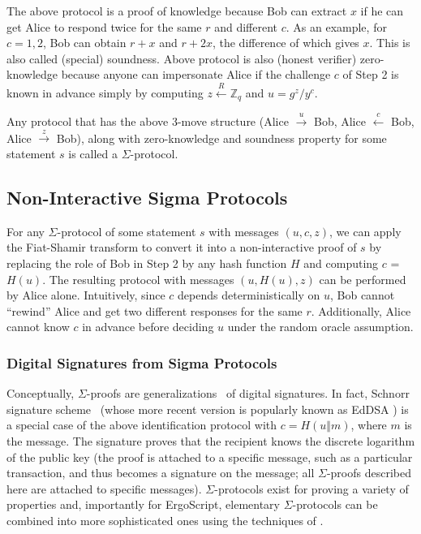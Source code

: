 \documentclass[11pt]{article}
\newcommand{\langname}{ErgoScript\xspace}
\begin{document}
The above protocol is a proof of knowledge because Bob can extract $x$ if he can get Alice to respond twice for the same $r$ and different $c$. As an example, for $c = 1, 2$, Bob can obtain $r+x$ and $r+2x$, the difference of which gives $x$. This is also called (special) soundness. Above protocol is also (honest verifier) zero-knowledge because anyone can impersonate Alice if the challenge $c$ of Step 2 is known in advance simply by computing $z \stackrel{R}{\leftarrow} \mathbb{Z}_q$ and $u = g^z/y^c$. 

Any protocol that has the above 3-move structure (Alice $\stackrel{u}{\rightarrow}$ Bob, Alice $\stackrel{c}{\leftarrow}$ Bob, Alice $\stackrel{z}{\rightarrow}$ Bob), along with zero-knowledge and soundness property for some statement $s$ is called a $\Sigma$-protocol. 

\subsection{Non-Interactive Sigma Protocols}
For any $\Sigma$-protocol of some statement $s$ with messages $(u, c, z)$, we can apply the Fiat-Shamir transform to convert it into a non-interactive proof of $s$ by replacing the role of Bob in Step 2 by any hash function $H$ and computing $c$ = $H(u)$. The resulting protocol with messages $(u, H(u), z)$ can be performed by Alice alone. Intuitively, since $c$ depends deterministically on $u$, Bob cannot ``rewind'' Alice and get two different responses for the same $r$. Additionally, Alice cannot know $c$ in advance before deciding $u$ under the random oracle assumption. 

\subsubsection{Digital Signatures from Sigma Protocols}
\label{digital-sig}
Conceptually, $\Sigma$-proofs \cite{Cra96} are generalizations~\cite{CL06} of digital signatures.
In fact, Schnorr signature scheme~\cite{Sch91} (whose more recent version is popularly known as EdDSA \cite{BDLSY12,rfc8032}) is a special case of the above identification protocol with $c = H(u \Vert m)$, where $m$ is the message. The signature proves that the recipient knows the discrete logarithm of the public key (the proof is attached to a specific message, such as a particular transaction, and thus becomes a signature on the message; all $\Sigma$-proofs described here are attached to specific messages). $\Sigma$-protocols exist for proving a variety of properties and, importantly for \langname, elementary $\Sigma$-protocols can be combined into more sophisticated ones using the techniques of \cite{CDS94}. 
\end{document}
